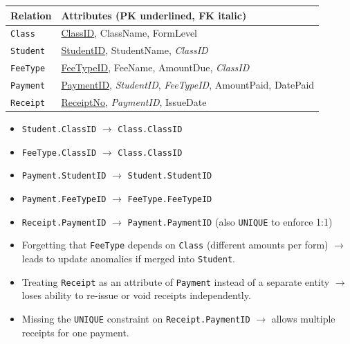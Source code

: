 \documentclass[11pt]{article}
\begin{document}
\begin{propriete}
\begin{center}
\begin{tabularx}{\linewidth}{|l|X|}\hline
\textbf{Relation} & \textbf{Attributes (PK underlined, FK italic)} \\ \hline
\texttt{Class} & \underline{ClassID}, ClassName, FormLevel \\
\texttt{Student} & \underline{StudentID}, StudentName, \textit{ClassID} \\
\texttt{FeeType} & \underline{FeeTypeID}, FeeName, AmountDue, \textit{ClassID} \\
\texttt{Payment} & \underline{PaymentID}, \textit{StudentID}, \textit{FeeTypeID}, AmountPaid, DatePaid \\
\texttt{Receipt} & \underline{ReceiptNo}, \textit{PaymentID}, IssueDate \\ \hline
\end{tabularx}
\end{center}
\begin{itemize}
    \item \texttt{Student.ClassID} $\rightarrow$ \texttt{Class.ClassID}
    \item \texttt{FeeType.ClassID} $\rightarrow$ \texttt{Class.ClassID}
    \item \texttt{Payment.StudentID} $\rightarrow$ \texttt{Student.StudentID}
    \item \texttt{Payment.FeeTypeID} $\rightarrow$ \texttt{FeeType.FeeTypeID}
    \item \texttt{Receipt.PaymentID} $\rightarrow$ \texttt{Payment.PaymentID} (also \texttt{UNIQUE} to enforce 1:1)
\end{itemize}
\end{propriete}

\begin{attention}
\begin{itemize}
    \item Forgetting that \texttt{FeeType} depends on \texttt{Class} (different amounts per form) $\rightarrow$ leads to update anomalies if merged into \texttt{Student}.
    \item Treating \texttt{Receipt} as an attribute of \texttt{Payment} instead of a separate entity $\rightarrow$ loses ability to re-issue or void receipts independently.
    \item Missing the \texttt{UNIQUE} constraint on \texttt{Receipt.PaymentID} $\rightarrow$ allows multiple receipts for one payment.
\end{itemize}
\end{attention}
\end{document}
